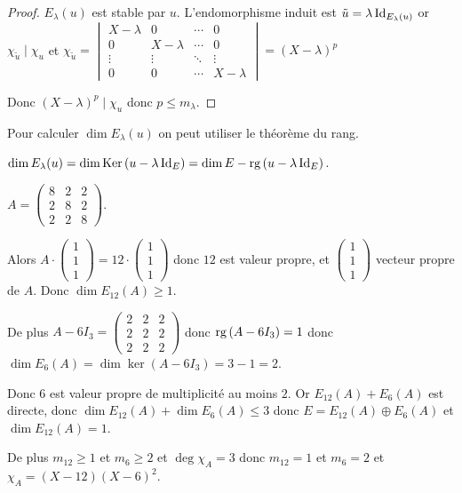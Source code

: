 \begin{proof}
    $E_\lambda(u)$ est stable par $u$. L'endomorphisme induit est $\tilde u = \lambda \operatorname{Id}_{E_\lambda(u)}$
    or $\chi_{\tilde u} \mid \chi_u$ et 
    $\chi_{\tilde u} = \begin{vmatrix}
        X - \lambda & 0 & \cdots & 0 \\
        0 & X - \lambda & \cdots & 0 \\
        \vdots & \vdots & \ddots & \vdots \\
        0 & 0 & \cdots & X - \lambda
    \end{vmatrix} = (X - \lambda)^p$

    Donc $(X - \lambda)^p \mid \chi_u$ donc $p \leqslant m_\lambda$.
\end{proof}

\begin{remarque}
    Pour calculer $\dim E_\lambda(u)$ on peut utiliser le théorème du rang. 

    $\dim E_\lambda(u) = \dim \operatorname{Ker} \, (u - \lambda \operatorname{Id}_E) = \dim E - \operatorname{rg} \,(u - \lambda \operatorname{Id}_E)$.
\end{remarque}



\begin{exemple}
    $A = \begin{pmatrix}
        8 & 2 & 2 \\
        2 & 8 & 2 \\
        2 & 2 & 8
    \end{pmatrix}$.

    Alors $A \cdot \begin{pmatrix}
        1 \\
        1 \\
        1
    \end{pmatrix} = 12 \cdot \begin{pmatrix}
        1 \\
        1 \\
        1
    \end{pmatrix}$ donc $12$ est valeur propre, et $\begin{pmatrix}
        1 \\
        1 \\
        1
    \end{pmatrix}$ vecteur propre de $A$. Donc $\dim E_{12}(A) \geqslant 1$.

    De plus $A - 6 I_3 = \begin{pmatrix}
        2 & 2 & 2 \\
        2 & 2 & 2 \\
        2 & 2 & 2
    \end{pmatrix}$ donc $\operatorname{rg} \,(A - 6 I_3) = 1$ donc $\dim E_6(A) = \dim \ker (A - 6 I_3) = 3 - 1 = 2$.

    Donc $6$ est valeur propre de multiplicité au moins $2$. Or $E_{12}(A) + E_6(A)$ est directe, donc 
    $\dim E_{12}(A) + \dim E_6(A) \leqslant 3$ donc $E = E_{12}(A) \oplus E_6(A)$ et $\dim E_{12}(A) = 1$.

    De plus $m_{12} \geqslant 1$ et $m_6 \geqslant 2$ et $\deg \chi_A = 3$ donc $m_{12} = 1$ et $m_6 = 2$
    et $\chi_A = (X - 12)(X - 6)^2$.

\end{exemple}


